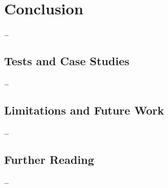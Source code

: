 
\chapter{Conclusion} \label{ch:Conclusion}

\dots

\section{Tests and Case Studies}

\dots

\section{Limitations and Future Work}

\dots

\section{Further Reading}

\dots
